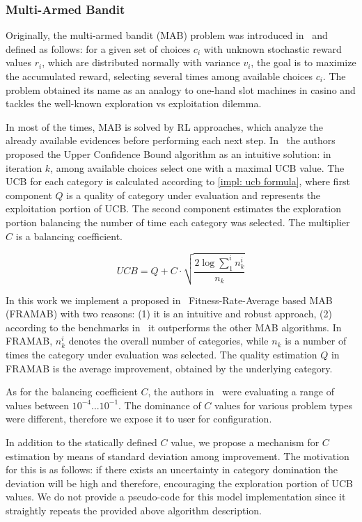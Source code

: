\subsubsection{Multi-Armed Bandit}\label{impl: FRAMAB}
Originally, the multi-armed bandit (MAB) problem was introduced in~\cite{robbins1952some} and defined as follows: for a given set of choices $c_i$ with unknown stochastic reward values $r_i$, which are distributed normally with variance $v_i$, the goal is to maximize the accumulated reward, selecting several times among available choices $c_i$. The problem obtained its name as an analogy to one-hand slot machines in casino and tackles the well-known exploration vs exploitation dilemma.

In most of the times, MAB is solved by RL approaches, which analyze the already available evidences before performing each next step. In~\cite{auer2002finite} the authors proposed the Upper Confidence Bound algorithm as an intuitive solution: in iteration $k$, among available choices select one with a maximal UCB value. The UCB for each category is calculated according to \cref{impl: ucb formula}, where first component $Q$ is a quality of category under evaluation and represents the exploitation portion of UCB. The second component estimates the exploration portion balancing the number of time each category was selected. The multiplier $C$ is a balancing coefficient.

\begin{equation}
UCB = Q + C \cdot \sqrt{\frac{2 \log \sum_{1}^{i} n_k^i}{n_k}}
\label{impl: ucb formula}
\end{equation}

In this work we implement a proposed in~\cite{li2013adaptive} Fitness-Rate-Average based MAB (FRAMAB) with two reasons: (1) it is an intuitive and robust approach, (2) according to the benchmarks in~\cite{ferreira2017multi} it outperforms the other MAB algorithms. In FRAMAB, $n_k^i$ denotes the overall number of categories, while $n_k$ is a number of times the category under evaluation was selected. The quality estimation $Q$ in FRAMAB is the average improvement, obtained by the underlying category.

As for the balancing coefficient $C$, the authors in~\cite{ferreira2017multi} were evaluating a range of values between $10^{-4}...10^{-1}$. The dominance of $C$ values for various problem types were different, therefore we expose it to user for configuration. 

In addition to the statically defined $C$ value, we propose a mechanism for $C$ estimation by means of standard deviation among improvement. The motivation for this is as follows: if there exists an uncertainty in category domination the deviation will be high and therefore, encouraging the exploration portion of UCB values. We do not provide a pseudo-code for this model implementation since it straightly repeats the provided above algorithm description.


